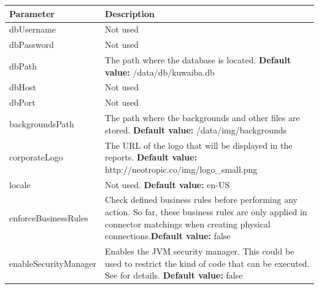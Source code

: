 \documentclass[a4paper]{article}
\begin{document}
\begin{itemize}
				\newpage
				\begin{table}[h!]
					\begin{tabular}[h!]{p{5cm}p{10cm}}
						\toprule
						\textbf{Parameter} & \textbf{Description} \\
						\midrule
						dbUsername & Not used \\
						\midrule
						dbPassword & Not used \\
						\midrule
						dbPath & The path where the database is located. \newline \textbf{Default value:} /data/db/kuwaiba.db \\ 
						\midrule
						dbHost & Not used \\
						\midrule
						dbPort & Not used \\
						\midrule
						backgroundsPath & The path where the backgrounds and other files are stored. \newline \textbf{Default value:} /data/img/backgrounds \\
						\midrule
						corporateLogo & The URL of the logo that will be displayed in the reports.  \newline \textbf{Default value:} http://neotropic.co/img/logo\_small.png\\
						\midrule
						locale & Not used.  \newline \textbf{Default value:} en-US\\
						\midrule
						enforceBusinessRules & Check defined business rules before performing any action. So far, these business rules are only applied in connector matchings when creating physical connections.\newline \textbf{Default value:} false\\
						\midrule
						enableSecurityManager & Enables the JVM security manager. This could be used to restrict the kind of code that can be executed. See \textbf{\nameref{app:AppendixA}} for details.  \newline \textbf{Default value:} false\\
						\bottomrule
					\end{tabular}
				\end{table}
				

\end{itemize}
\end{document}
